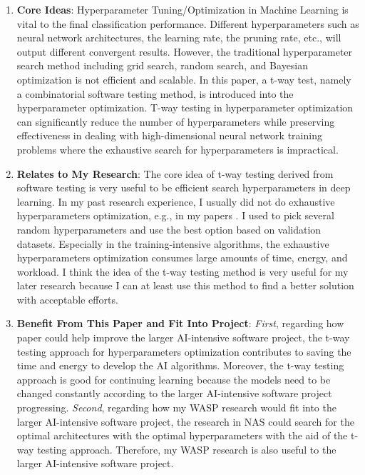 \documentclass[11pt]{article}
\begin{document}
\begin{enumerate}
  \item \textbf{Core Ideas}: Hyperparameter Tuning/Optimization in Machine Learning is vital to the final classification performance. Different hyperparameters such as neural network architectures, the learning rate, the pruning rate, etc., will output different convergent results. However, the traditional hyperparameter search method including grid search, random search, and Bayesian optimization is not efficient and scalable. In this paper, a t-way test, namely a combinatorial software testing method, is introduced into the hyperparameter optimization. T-way testing in hyperparameter optimization can significantly reduce the number of hyperparameters while preserving effectiveness in dealing with high-dimensional neural network training problems where the exhaustive search for hyperparameters is impractical.
  
  \item \textbf{Relates to My Research}: The core idea of t-way testing derived from software testing is very useful to be efficient search hyperparameters in deep learning. In my past research experience, I usually did not do exhaustive hyperparameters optimization, e.g., in my papers \cite{huang2023epilepsynet, huang2023lightweight, aminifar2024lightweight}. I used to pick several random hyperparameters and use the best option based on validation datasets. Especially in the training-intensive algorithms, the exhaustive hyperparameters optimization consumes large amounts of time, energy, and workload. I think the idea of the t-way testing method is very useful for my later research because I can at least use this method to find a better solution with acceptable efforts. 

  \item \textbf{Benefit From This Paper and Fit Into Project}:
\textit{First}, regarding how paper \cite{khadka2024combinatorial} could help improve the larger AI-intensive software project, the t-way testing approach for hyperparameters optimization contributes to saving the time and energy to develop the AI algorithms. Moreover, the t-way testing approach is good for continuing learning because the models need to be changed constantly according to the larger AI-intensive software project progressing. \textit{Second}, regarding how my WASP research would fit into the larger AI-intensive software project, the research in \gls{NAS} could search for the optimal architectures with the optimal hyperparameters with the aid of the t-way testing approach. Therefore, my WASP research is also useful to the larger AI-intensive software project.


\end{enumerate}
\end{document}
